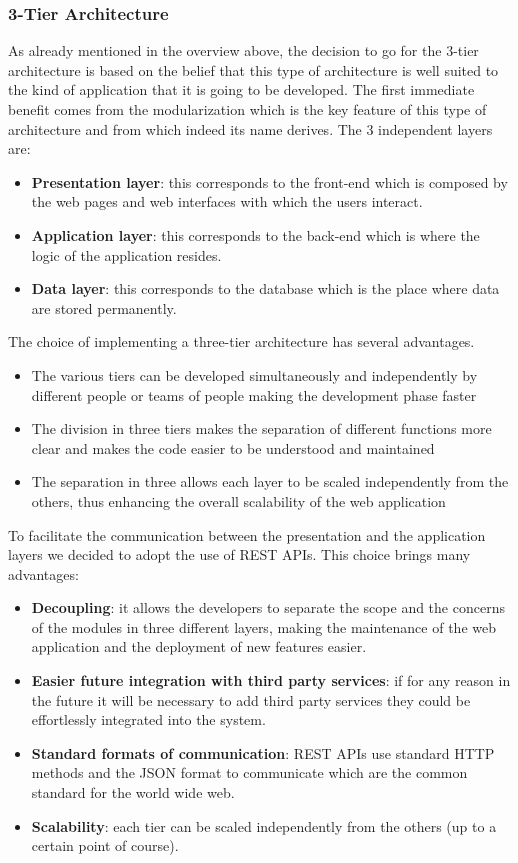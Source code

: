 \subsubsection{3-Tier Architecture}
As already mentioned in the overview above, the decision to go for the 3-tier architecture is based on the belief that this type of architecture is well suited to the kind of application that it is going to be developed.
The first immediate benefit comes from the modularization which is the key feature of this type of architecture and from which indeed its name derives. The 3 independent layers are: 
\begin{itemize}
    \item \textbf{Presentation layer}: this corresponds to the front-end which is composed by the web pages and web interfaces with which the users interact.
    \item \textbf{Application layer}: this corresponds to the back-end which is where the logic of the application resides. 
    \item \textbf{Data layer}: this corresponds to the database which is the place where data are stored permanently.
\end{itemize}
The choice of implementing a three-tier architecture has several advantages.
\begin{itemize}
    \item The various tiers can be developed simultaneously and independently by different people or teams of people making the development phase faster
    \item The division in three tiers makes the separation of different functions more clear and makes the code easier to be understood and maintained
    \item The separation in three allows each layer to be scaled independently from the others, thus enhancing the overall scalability of the web application
\end{itemize}
To facilitate the communication between the presentation  and the application layers we decided to adopt the use of REST APIs. This choice brings many advantages:
\begin{itemize}
    \item \textbf{Decoupling}: it allows the developers to separate the scope and the concerns of the modules in three different layers, making the maintenance of the web application and the deployment of new features easier.
    \item \textbf{Easier future integration with third party services}: if for any reason in the future it will be necessary to add third party services they could be  effortlessly integrated into the system. 
    \item \textbf{Standard formats of communication}: REST APIs use standard HTTP methods and the JSON format to communicate which are the common standard for the world wide web.
    \item \textbf{Scalability}: each tier can be scaled independently from the others (up to a certain point of course).
\end{itemize}
